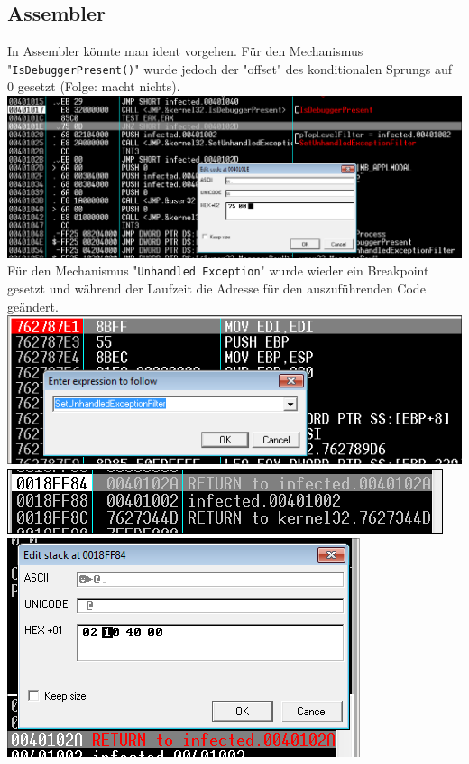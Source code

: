 \documentclass{article}
\begin{document}
	\pagebreak
	
	\subsection*{Assembler}
	In Assembler könnte man ident vorgehen. Für den Mechanismus "\texttt{IsDebuggerPresent()}" wurde jedoch der "offset" des konditionalen Sprungs auf 0 gesetzt (Folge: macht nichts).\\
	\includegraphics[width=0.7\linewidth]{"pictures/asm - rev - isdebugged.png"}\\
	Für den Mechanismus "\texttt{Unhandled Exception}" wurde wieder ein Breakpoint gesetzt und während der Laufzeit die Adresse für den auszuführenden Code geändert.\\
	\includegraphics[width=0.7\linewidth]{"pictures/asm - rev - unhandled exception - breakpoint bei setunhandled exception.png"}\\
	\includegraphics[width=0.7\linewidth]{"pictures/asm - rev - unhandled exception - stack.png"}\\
	\includegraphics[width=0.7\linewidth]{"pictures/asm - rev - stack2.png"}\\
	
\end{document}
